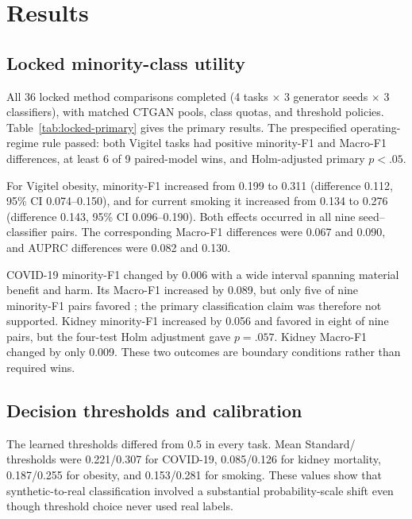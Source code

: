 \section{Results}
\label{sec:results}

\subsection{Locked minority-class utility}

All 36 locked method comparisons completed (4 tasks $\times$ 3 generator seeds $\times$ 3 classifiers), with matched CTGAN pools, class quotas, and threshold policies. Table~\ref{tab:locked-primary} gives the primary results. The prespecified operating-regime rule passed: both Vigitel tasks had positive minority-F1 and Macro-F1 differences, at least 6 of 9 paired-model wins, and Holm-adjusted primary $p<.05$.



For Vigitel obesity, minority-F1 increased from 0.199 to 0.311 (difference 0.112, 95\% CI 0.074--0.150), and for current smoking it increased from 0.134 to 0.276 (difference 0.143, 95\% CI 0.096--0.190). Both effects occurred in all nine seed--classifier pairs. The corresponding Macro-F1 differences were 0.067 and 0.090, and AUPRC differences were 0.082 and 0.130.

COVID-19 minority-F1 changed by 0.006 with a wide interval spanning material benefit and harm. Its Macro-F1 increased by 0.089, but only five of nine minority-F1 pairs favored \sepa{}; the primary classification claim was therefore not supported. Kidney minority-F1 increased by 0.056 and favored \sepa{} in eight of nine pairs, but the four-test Holm adjustment gave $p=.057$. Kidney Macro-F1 changed by only 0.009. These two outcomes are boundary conditions rather than required wins.

\subsection{Decision thresholds and calibration}

The learned thresholds differed from 0.5 in every task. Mean Standard/\sepa{} thresholds were 0.221/0.307 for COVID-19, 0.085/0.126 for kidney mortality, 0.187/0.255 for obesity, and 0.153/0.281 for smoking. These values show that synthetic-to-real classification involved a substantial probability-scale shift even though threshold choice never used real labels.

